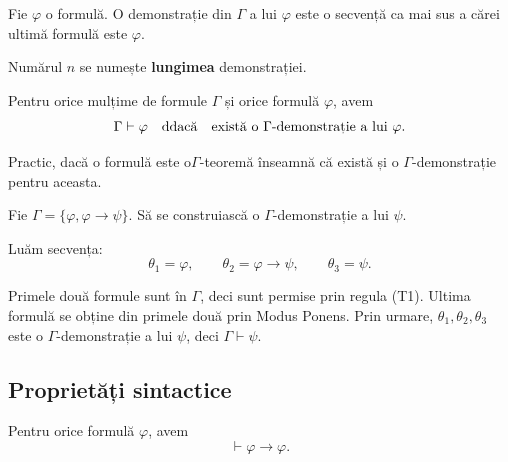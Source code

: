 \begin{definition}
	Fie \( \varphi \) o formulă. O demonstrație din \( \Gamma \) a lui \( \varphi \) este o secvență ca mai sus
	a cărei ultimă formulă este \( \varphi \).

	Numărul \( n \) se numește \textbf{lungimea} demonstrației.
\end{definition}

\begin{prop}
	Pentru orice mulțime de formule \( \Gamma \) și orice formulă \( \varphi \), avem
	\[
		\Gamma \vdash \varphi \quad \text{ddacă} \quad \text{există o \( \Gamma \)-demonstrație a lui } \varphi.
	\]
\end{prop}

Practic, dacă o formulă este o\( \Gamma \)-teoremă înseamnă că există și o \( \Gamma \)-demonstrație pentru aceasta.

\begin{ex}
	Fie \( \Gamma = \{\varphi, \varphi \to \psi\} \). Să se construiască o \( \Gamma \)-demonstrație a lui \( \psi \).
\end{ex}

\begin{solutie}
	Luăm secvența:
	\[
		\theta_1 = \varphi, \qquad \theta_2 = \varphi \to \psi, \qquad \theta_3 = \psi.
	\]

	Primele două formule sunt în \( \Gamma \), deci sunt permise prin regula (T1). Ultima formulă se obține din primele două prin Modus Ponens.
	Prin urmare, \( \theta_1, \theta_2, \theta_3 \) este o \( \Gamma \)-demonstrație a lui \( \psi \), deci \( \Gamma \vdash \psi \).
\end{solutie}

\subsection{Proprietăți sintactice}

\begin{prop}
	Pentru orice formulă \( \varphi \), avem
	\[
		\vdash \varphi \to \varphi.
	\]
\end{prop}

